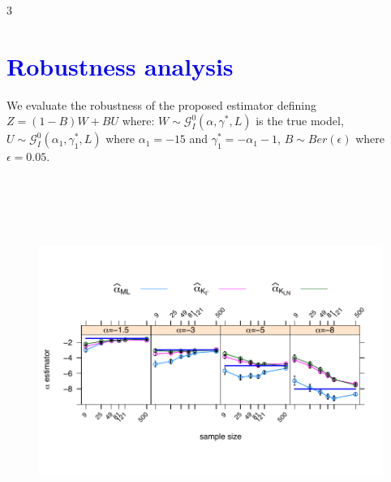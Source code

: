 \documentclass[a0,portrait]{a0poster}
\begin{document}
\begin{parcolumns}[colwidths={1=.3\textwidth,2=.39\textwidth},rulebetweencolor=blue
	,rulebetween=true]{3}
{\begin{minipage}[t]{1\linewidth}
\section*{\textcolor{blue}{Robustness analysis}}
\label{robustez}
We  evaluate the robustness of the proposed estimator defining $Z=(1-B)W+BU$ where: $W \sim \mathcal{G}_I^0(\alpha,\gamma^*,L)$ is the true model, $U \sim \mathcal{G}_I^0(\alpha_1,\gamma_1^*,L)$ where $\alpha_1=-15$ and $\gamma_1^*=-\alpha_1-1$, $B \sim Ber(\epsilon)$ where $\epsilon=0.05$. 
\begin{center}
	\begin{minipage}[t]{1\linewidth}
		\begin{figure}
		\includegraphics[width=20cm, height=12cm]{../../../../Figures/IVJIAAIS2017/Cont/alfa500_sinmenos20_CONTMVconX0yGAyLN_OPTIM_hasta500_MOM1_2_SinCte_Ver2FINALbarrasdeerror_L3.pdf}\\
		\end{figure}
	\end{minipage}
\end{center}


\end{minipage}}
\end{parcolumns}
\end{document}
